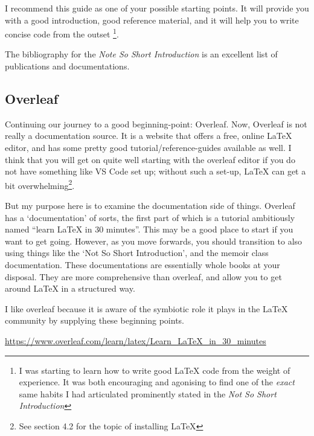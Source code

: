 \documentclass[11pt, oneside]{memoir}
\begin{document}
I recommend this guide as one of your possible starting points. It will provide you with a good introduction, good reference material, and it will help you to write concise code from the outset \footnote{I was starting to learn how to write good LaTeX code from the weight of experience. It was both encouraging and agonising to find one of the \emph{exact} same habits I had articulated prominently stated in the \emph{Not So Short Introduction}}.

The bibliography for the \emph{Note So Short Introduction} is an excellent list of publications and documentations.

\subsection{Overleaf}

Continuing our journey to a good beginning-point: Overleaf. Now, Overleaf is not really a documentation source. It is a website that offers a free, online LaTeX editor, and has some pretty good tutorial/reference-guides available as well. I think that you will get on quite well starting with the overleaf editor if you do not have something like VS Code set up; without such a set-up, LaTeX can get a bit overwhelming\footnote{See section 4.2 for the topic of installing LaTeX}.

But my purpose here is to examine the documentation side of things. Overleaf has a `documentation' of sorts, the first part of which is a tutorial ambitiously named ``learn LaTeX in 30 minutes''. This may be a good place to start if you want to get going. However, as you move forwards, you should transition to also using things like the `Not So Short Introduction', and the memoir class documentation. These documentations are essentially whole books at your disposal. They are more comprehensive than overleaf, and allow you to get around LaTeX in a structured way.

I like overleaf because it is aware of the symbiotic role it plays in the LaTeX community by supplying these beginning points.

\url{https://www.overleaf.com/learn/latex/Learn_LaTeX_in_30_minutes}
\end{document}
